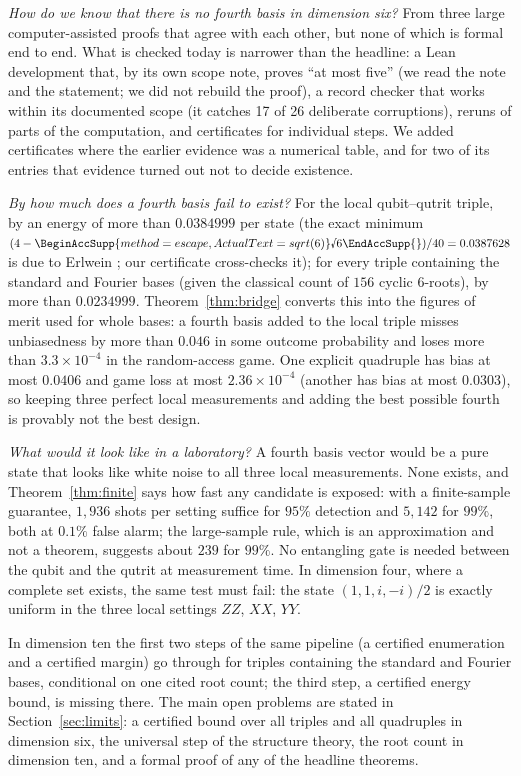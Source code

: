 \documentclass[11pt]{article}
\newcommand{\rnum}[1]{\BeginAccSupp{method=escape,ActualText=sqrt(#1)}\text{\textsurd}#1\EndAccSupp{}}
\newcommand{\rsix}{\rnum{6}}
\theoremstyle{definition}
\theoremstyle{remark}
\begin{document}
\emph{How do we know that there is no fourth basis in dimension six?} From three large computer-assisted proofs
that agree with each other, but none of which is formal end to end. What is checked today is narrower than
the headline: a Lean development that, by its own scope note, proves ``at most five'' (we read the note and the
statement; we did not rebuild the proof), a record checker that works within its documented scope (it catches 17
of 26 deliberate corruptions), reruns of parts of the computation, and certificates for individual steps. We added certificates where the earlier
evidence was a numerical table, and for two of its entries that evidence turned out not to decide existence.

\emph{By how much does a fourth basis fail to exist?} For the local qubit--qutrit triple, by an energy of more than
$0.0384999$ per state (the exact minimum $(4-\rsix)/40=0.0387628$ is due to Erlwein \cite{Erlwein}; our certificate
cross-checks it); for every triple containing the standard and Fourier bases (given the classical count of $156$ cyclic $6$-roots), by more than $0.0234999$.
Theorem~\ref{thm:bridge} converts this into the figures of merit used for whole bases: a fourth basis added to the
local triple misses unbiasedness by more than $0.046$ in some outcome probability and loses more than
$3.3\times10^{-4}$ in the random-access game. One explicit quadruple has bias at most $0.0406$ and game loss at most $2.36\times10^{-4}$ (another has bias at most $0.0303$), so keeping
three perfect local measurements and adding the best possible fourth is provably not the best design.

\emph{What would it look like in a laboratory?} A fourth basis vector would be a pure state that looks like white
noise to all three local measurements. None exists, and Theorem~\ref{thm:finite} says how fast any candidate is
exposed: with a finite-sample guarantee, $1{,}936$ shots per setting suffice for $95\%$ detection and $5{,}142$ for
$99\%$, both at $0.1\%$ false alarm; the large-sample rule, which is an approximation and not a theorem, suggests
about $239$ for $99\%$. No entangling gate is needed between the qubit and the qutrit at measurement
time. In dimension four, where a complete set exists, the same test must fail: the state $(1,1,i,-i)/2$ is
exactly uniform in the three local settings $ZZ$, $XX$, $YY$.

In dimension ten the first two steps of the same pipeline (a certified enumeration and a certified margin) go
through for triples containing the standard and Fourier bases, conditional on one cited root count; the third
step, a certified energy bound, is missing there. The main open problems are stated in Section~\ref{sec:limits}: a
certified bound over all triples and all quadruples in dimension six, the universal step of the structure theory,
the root count in dimension ten, and a formal proof of any of the headline theorems.
\end{document}
